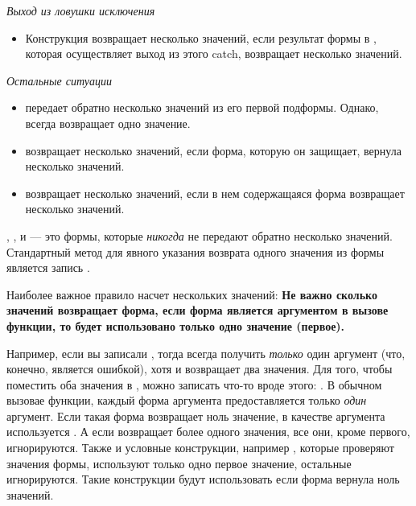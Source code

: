 \begin{flushdesc}
\item[\emph{Выход из ловушки исключения}]\leavevmode
\begin{itemize}

\item
Конструкция  возвращает несколько значений, если результат формы в
, которая осуществляет выход из этого catch, возвращает несколько
значений.
\end{itemize}

\item[\emph{Остальные ситуации}]\leavevmode
\begin{itemize}

\item
{} передает обратно несколько значений из его первой
подформы. Однако,  всегда возвращает одно значение.

\item
{} возвращает несколько значений, если форма, которую он
защищает, вернула несколько значений.

\item
{} возвращает несколько значений, если в нем содержащаяся форма
возвращает несколько значений.
\end{itemize}
\end{flushdesc}

,
,  и  --- это формы, которые
\emph{никогда} не передают обратно несколько значений.
Стандартный метод для явного указания возврата одного значения из формы  
является запись .

Наиболее важное правило насчет нескольких значений:
\textbf{Не важно сколько значений возвращает форма, если форма является
  аргументом в вызове функции, то будет использовано только одно значение
  (первое).} 

Например, если вы записали , тогда  всегда
получить \emph{только} один аргумент (что, конечно, является ошибкой), хотя и
 возвращает два значения. Для того, чтобы поместить оба значения
 в , можно записать что-то вроде этого:
.
В обычном вызовае функции, каждый форма аргумента предоставляется только
\emph{один} аргумент. Если такая форма возвращает ноль значение, в качестве
аргумента используется {\false}. А если возвращает более одного значения, все
они, кроме первого, игнорируются.
Также и условные конструкции, например , которые проверяют значения
формы, используют только одно первое значение, остальные игнорируются.
Такие конструкции будут использовать {\false} если форма вернула ноль значений.

